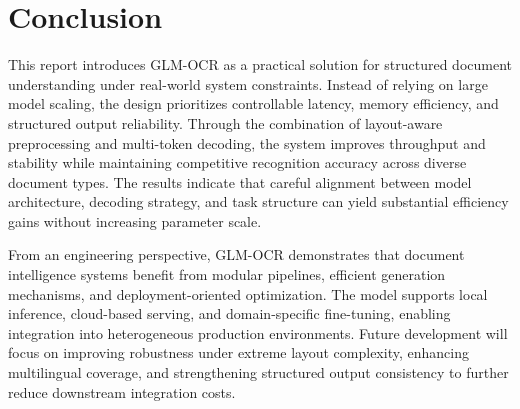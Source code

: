\section{Conclusion}

This report introduces GLM-OCR as a practical solution for structured document understanding under real-world system constraints. Instead of relying on large model scaling, the design prioritizes controllable latency, memory efficiency, and structured output reliability. Through the combination of layout-aware preprocessing and multi-token decoding, the system improves throughput and stability while maintaining competitive recognition accuracy across diverse document types. The results indicate that careful alignment between model architecture, decoding strategy, and task structure can yield substantial efficiency gains without increasing parameter scale.

From an engineering perspective, GLM-OCR demonstrates that document intelligence systems benefit from modular pipelines, efficient generation mechanisms, and deployment-oriented optimization. The model supports local inference, cloud-based serving, and domain-specific fine-tuning, enabling integration into heterogeneous production environments. Future development will focus on improving robustness under extreme layout complexity, enhancing multilingual coverage, and strengthening structured output consistency to further reduce downstream integration costs.
